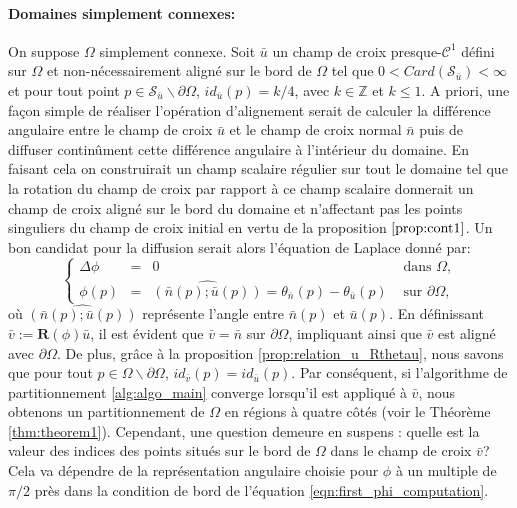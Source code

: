 \paragraph{Domaines simplement connexes:}
On suppose $\Omega$ simplement connexe. Soit $\bar{u}$ un champ de croix presque-$\mathcal{C}^1$ défini sur $\Omega$ et non-nécessairement aligné sur le bord de $\Omega$ tel que $0<Card(\mathcal{S}_{\bar{u}})<\infty$ et pour tout point $p\in\mathcal{S}_{\bar{u}}\backslash\partial\Omega$, $id_{\bar{u}}(p)=k/4$, avec $k\in\mathbb{Z}$ et $k\leq 1$. A priori, une façon simple de réaliser l'opération d'alignement serait de calculer la différence angulaire entre le champ de croix $\bar{u}$ et le champ de croix normal $\bar{n}$ puis de diffuser continûment cette différence angulaire à l'intérieur du domaine. En faisant cela on construirait un champ scalaire régulier sur tout le domaine tel que la rotation du champ de croix par rapport à ce champ scalaire donnerait un champ de croix aligné sur le bord du domaine et n'affectant pas les points singuliers du champ de croix initial en vertu de la proposition $\ref{prop:cont1}$. Un bon candidat pour la diffusion serait alors l'équation de Laplace donné par:\begin{equation}
\left\{
\begin{array}{lcll}
\Delta\phi &=& 0 &\mbox{ dans }\Omega,\\[0.5cm]
\phi(p) &=& \widehat{(\bar{n}(p); \bar{u}(p))}=\theta_{\bar{n}}(p)-\theta_{\bar{u}}(p)&\mbox{ sur } \partial\Omega,
\end{array}
\right.
\label{eqn:first_phi_computation}
\end{equation}
où $\widehat{(\bar{n}(p); \bar{u}(p))}$ représente l'angle entre $\bar{n}(p)$ et $\bar{u}(p)$. En définissant $\bar{v}:=\mathbf{R}(\phi)\bar{u}$, il est évident que $\bar{v}=\bar{n}$ sur $\partial\Omega$, impliquant ainsi que $\bar{v}$ est aligné avec $\partial\Omega$. De plus, grâce à la proposition \ref{prop:relation_u_Rthetau}, nous savons que pour tout $p\in\Omega\backslash\partial\Omega$, $id_{\bar{v}}(p)=id_{\bar{u}}(p)$. Par conséquent, si l'algorithme de partitionnement \ref{alg:algo_main} converge lorsqu'il est appliqué à $\bar{v}$, nous obtenons un partitionnement de $\Omega$ en régions à quatre côtés (voir le Théorème \ref{thm:theorem1}). Cependant, une question demeure en suspens : quelle est la valeur des indices des points situés sur le bord de $\Omega$ dans le champ de croix $\bar{v}$? Cela va dépendre de la représentation angulaire choisie pour $\phi$ à un multiple de $\pi/2$ près dans la condition de bord de l'équation \eqref{eqn:first_phi_computation}.

